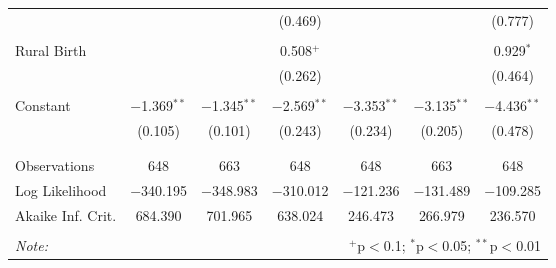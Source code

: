 \begin{table}[!htbp]
\begin{tabular}{@{\extracolsep{5pt}}lcccccc}
  &  &  & (0.469) &  &  & (0.777) \\ 
  & & & & & & \\ 
 Rural Birth &  &  & 0.508$^{+}$ &  &  & 0.929$^{*}$ \\ 
  &  &  & (0.262) &  &  & (0.464) \\ 
  & & & & & & \\ 
 Constant & $-$1.369$^{**}$ & $-$1.345$^{**}$ & $-$2.569$^{**}$ & $-$3.353$^{**}$ & $-$3.135$^{**}$ & $-$4.436$^{**}$ \\ 
  & (0.105) & (0.101) & (0.243) & (0.234) & (0.205) & (0.478) \\ 
  & & & & & & \\ 
\hline \\[-1.8ex] 
Observations & 648 & 663 & 648 & 648 & 663 & 648 \\ 
Log Likelihood & $-$340.195 & $-$348.983 & $-$310.012 & $-$121.236 & $-$131.489 & $-$109.285 \\ 
Akaike Inf. Crit. & 684.390 & 701.965 & 638.024 & 246.473 & 266.979 & 236.570 \\ 
\hline 
\hline \\[-1.8ex] 
\textit{Note:}  & \multicolumn{6}{r}{$^{+}$p$<$0.1; $^{*}$p$<$0.05; $^{**}$p$<$0.01}} \\ 
\end{tabular} 
\end{table} 
